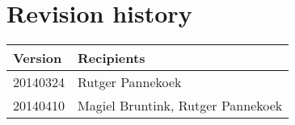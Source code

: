 \chapter*{Revision history}

\begin{tabular}{| p{3cm} | p{12cm} |}
	\hline
	\bfseries{Version} & \bfseries{Recipients} \\ \hline
	20140324 & Rutger Pannekoek \\ \hline
	20140410 & Magiel Bruntink, Rutger Pannekoek \\
	\hline
\end{tabular}
